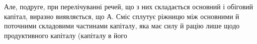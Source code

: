Але, подруге, при перелічуванні речей, що з них складається основний
і обіговий капітал, виразно виявляється, що А. Сміс сплутує ріжницю
між основними й поточними складовими частинами капіталу, яка має
силу й рацію лише щодо продуктивного капіталу (капіталу в його
\parbreak{}  %
